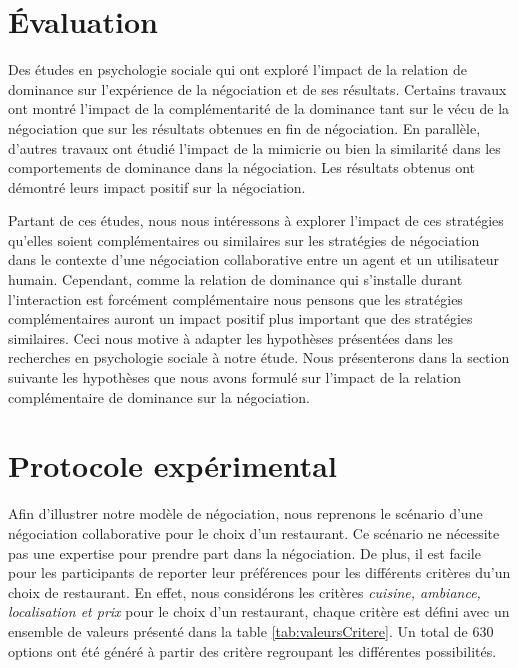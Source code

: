 
\section{Évaluation}

Des études en psychologie sociale qui ont exploré l'impact de la relation de dominance sur l'expérience de la négociation et de ses résultats. Certains travaux ont montré l'impact de la complémentarité de la dominance tant sur le vécu de la négociation que sur les résultats obtenues en fin de négociation.
En parallèle, d'autres travaux ont étudié l'impact de la mimicrie ou bien la similarité dans les comportements de dominance dans la négociation. Les résultats obtenus ont démontré leurs impact positif sur la négociation.

Partant de ces études,  nous nous intéressons à explorer l'impact de ces stratégies qu'elles soient complémentaires ou similaires sur les stratégies de négociation dans le contexte d'une négociation collaborative entre un agent et un utilisateur humain. Cependant, comme la relation de dominance qui s'installe durant l'interaction est forcément complémentaire nous pensons que les stratégies complémentaires auront un impact positif plus important que des stratégies similaires. Ceci nous motive à adapter les hypothèses présentées dans les recherches en psychologie sociale à notre étude. Nous présenterons dans la section suivante les hypothèses que nous avons formulé sur l'impact de la relation complémentaire de dominance sur la négociation.

\section{Protocole expérimental}

	Afin d'illustrer notre modèle de négociation, nous reprenons le scénario d'une négociation collaborative pour le choix d'un restaurant.
	Ce scénario ne nécessite pas une expertise pour prendre part dans la négociation. De plus, il est facile pour les participants de reporter leur préférences pour les différents critères du'un choix de restaurant. En effet, nous considérons les critères \textit{cuisine, ambiance, localisation et prix} pour le choix d'un restaurant, chaque critère est défini avec un ensemble de valeurs présenté dans la table \ref{tab:valeursCritere}. Un total de 630 options ont été généré à partir des critère regroupant les différentes possibilités. 
	
